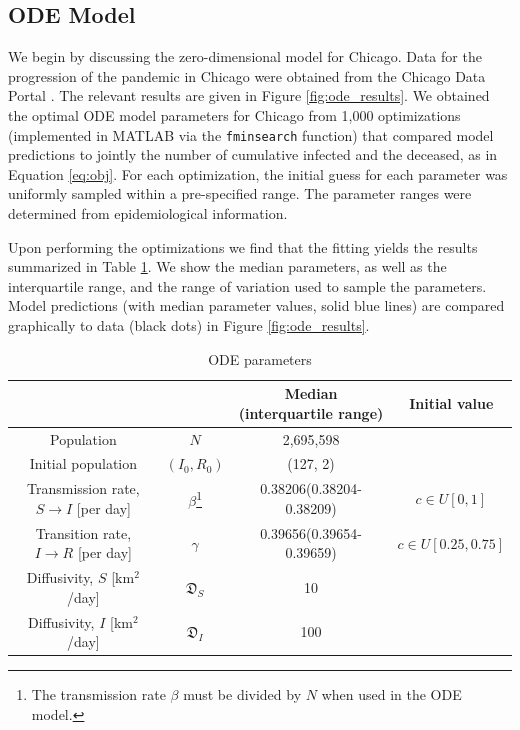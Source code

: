 \documentclass[11pt]{article}
\newcommand{\D}{\mathfrak{D}}
\begin{document}
\subsection{ODE Model}
We begin by discussing the zero-dimensional model for Chicago.
Data for the progression of the pandemic in Chicago were obtained from the Chicago Data Portal \cite{Chicago_2021}.
The relevant results are given in Figure \ref{fig:ode_results}.
We obtained the optimal ODE model parameters for Chicago from 1,000 optimizations (implemented in MATLAB via the \verb|fminsearch| function)
that compared model predictions to jointly the number of cumulative infected and the deceased, as in Equation \ref{eq:obj}.
For each optimization, the initial guess for each parameter was uniformly sampled within a pre-specified range.
The parameter ranges were determined from epidemiological information.

Upon performing the optimizations we find that the fitting yields the results summarized in Table \ref{tab:parameters}.
We show the median parameters, as well as the interquartile range, and the range of variation used to sample the parameters.
Model predictions (with median parameter values, solid blue lines) are compared graphically to data (black dots) in Figure \ref{fig:ode_results}.

\begin{savenotes}
\begin{table}[h]
	\centering
	\caption{ODE parameters}
	\label{tab:parameters}
	\begin{tabular}{ c c c c }
		\hline
		\hline
			&	&	Median (interquartile range)	&	Initial value \\
		\hline
		Population	&	$N$	&	2,695,598 \\
		Initial population	&	$(I_0, R_0)$	&	(127, 2) \\
		Transmission rate, $S \rightarrow I$ [per day]	&	$\beta$\footnote{The transmission rate $\beta$ must be divided by $N$ when used in the ODE model.}	&	0.38206(0.38204-0.38209)	&	$c \in U[0,1]$ \\
		Transition rate, $I \rightarrow R$ [per day]	&	$\gamma$	&	 0.39656(0.39654-0.39659)	&	$c \in U[0.25,0.75]$ \\
		Diffusivity, $S$ [km$^2$/day]	&	$\D_S$	&	10	&	\\
		Diffusivity, $I$ [km$^2$/day]	&	$\D_I$	&	100	&	\\
		\hline
		\hline
	\end{tabular}
\end{table}
\end{savenotes}
\end{document}
